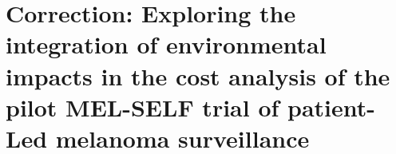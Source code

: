 \chapter{Correction: Exploring the integration of environmental impacts in the cost analysis of the pilot MEL-SELF trial of patient-Led melanoma surveillance}
\label{ap-a}

